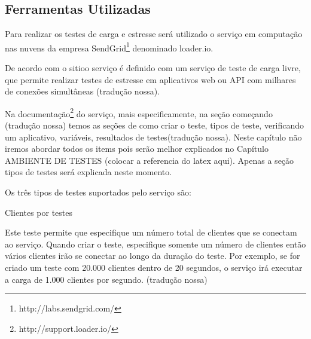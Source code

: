 




\subsection{Ferramentas Utilizadas}
\label{ferramentas-utilizadas-para-testes}
  
  Para realizar os testes de carga e estresse será utilizado o serviço em computação nas nuvens
  da empresa SendGrid\footnote{http://labs.sendgrid.com/} denominado loader.io\footnotemark[\ref{loader.io}].
  
  De acordo com o sitio\footnotemark[\ref{loader.io}] o serviço é definido com um serviço de teste de carga livre,
  que permite realizar testes de estresse em aplicativos web ou \ac{API} com milhares de conexões simultâneas
  (tradução nossa).
  
  Na documentação\footnote{http://support.loader.io/} do serviço, mais especificamente, na seção começando (tradução nossa)
  temos as seções de como criar o teste, tipos de teste, verificando um aplicativo, variáveis,
  resultados de testes(tradução nossa). Neste capítulo não iremos abordar todos os items pois serão melhor explicados
  no Capítulo AMBIENTE DE TESTES (colocar a referencia do latex aqui). Apenas a seção tipos de testes será explicada neste 
  momento.
  
  Os três tipos de testes suportados pelo serviço são:
  
  Clientes por testes
  
  Este teste permite que especifique um número total de clientes que se conectam ao serviço. Quando criar o teste,
  especifique somente um número de clientes então vários clientes irão se conectar ao longo da duração do teste. 
  Por exemplo, se for criado um teste com 20.000 clientes dentro de 20 segundos, o serviço irá executar a carga de 
  1.000 clientes por segundo. (tradução nossa)
  
